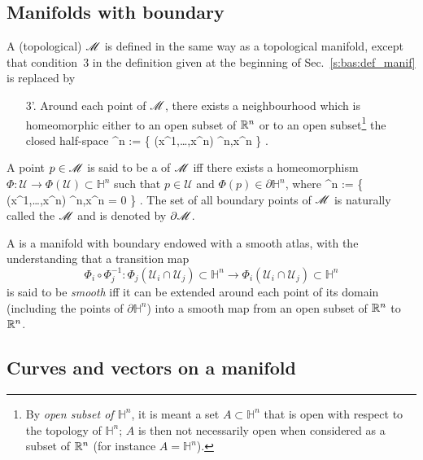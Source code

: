 \subsection{Manifolds with boundary} \label{s:bas:manif_boundary}

A (topological)  $\mathscr{M}$ is defined in the same way
as a topological manifold, except that condition~3 in the definition given
at the beginning of Sec.~\ref{s:bas:def_manif} is replaced by
\begin{itemize}
\item[3'.] Around each point of $\mathscr{M}$, there exists a neighbourhood which is
homeomorphic either to an open subset of $\mathbb{R}^n$ or to an open subset\footnote{By \emph{open subset of $\mathbb{H}^n$}, it is meant a set $A\subset \mathbb{H}^n$ that is open with respect to the topology of $\mathbb{H}^n$; $A$ is then not necessarily open when considered
as a subset of $\mathbb{R}^n$ (for instance $A=\mathbb{H}^n$).}
the closed half-space
\be
    ^n := \left\{ (x^1,\ldots,x^n) \in \R^n,\quad x^n  \right\} .
\ee
\end{itemize}
A point $p\in \mathscr{M}$ is said to be a  of $\mathscr{M}$ iff
there exists a homeomorphism $\Phi: \mathcal{U} \rightarrow \Phi(\mathcal U) \subset \mathbb{H}^n$ such that $p\in\mathcal{U}$ and $\Phi(p)\in \partial \mathbb{H}^n$, where
\be
    \partial{}^n := \left\{ (x^1,\ldots,x^n) \in \R^n,\quad x^n = 0 \right\} .
\ee
The set of all boundary points of $\mathscr{M}$ is naturally called the
 $\mathscr{M}$ and is denoted by
$\partial\mathscr{M}$.

A  is a manifold with boundary endowed with a
smooth atlas, with the understanding that a transition map
\[
    \Phi_i \circ \Phi_j^{-1} : \Phi_j(\mathcal{U}_i \cap \mathcal{U}_j)
    \subset \mathbb{H}^n \longrightarrow \Phi_i(\mathcal{U}_i \cap \mathcal{U}_j)
    \subset \mathbb{H}^n
\]
is said to be \emph{smooth} iff
it can be extended around each point of its domain
(including the points of $\partial\mathbb{H}^n$) into a smooth map
from an open subset of $\mathbb{R}^n$ to $\mathbb{R}^n$.

\subsection{Curves and vectors on a manifold} \label{s:bas:vectors}

